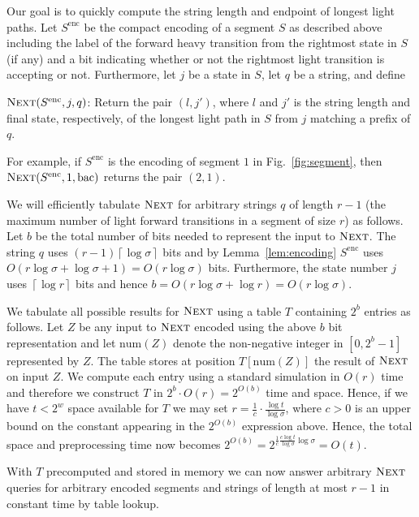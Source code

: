 \documentclass{article}
\newcommand{\num}{\ensuremath{\mathrm{num}}}
\newcommand{\enc}{\ensuremath{\mathrm{enc}}}
\newcommand{\Next}{\ensuremath{\textsc{Next}}}
\newcommand{\ceil}[1]{\left\lceil{#1}\right\rceil}
\begin{document}
Our goal is to quickly compute the string length and endpoint of
longest light paths. Let $S^{\enc}$ be the compact encoding of a
segment $S$ as described above including the label of the forward
heavy transition from the rightmost state in $S$ (if any) and a bit
indicating whether or not the rightmost light transition is accepting
or not. Furthermore, let $j$ be a state in $S$, let $q$ be a string,
and define
\begin{relate}
\item[$\Next(S^{\enc}, j, q)$:] Return the pair $(l, j')$, where $l$
  and $j'$ is the string length and final state, respectively, of the longest
  light path in $S$ from $j$ matching a prefix of $q$.
\end{relate}
For example, if $S^{\enc}$ is the encoding of segment $1$
in Fig.~\ref{fig:segment}, then $\Next(S^{\enc}, 1, \text{bac})$
returns the pair $(2, 1)$. 


We will efficiently tabulate $\Next$ for arbitrary strings $q$ of
length $r-1$ (the maximum number of light forward transitions in a
segment of size $r$) as follows. Let $b$ be the total number of bits
needed to represent the input to $\Next$. The string $q$ uses $(r-1)
\ceil{\log \sigma}$ bits and by Lemma~\ref{lem:encoding} $S^\enc$ uses
$O(r \log \sigma + \log \sigma + 1) = O(r \log \sigma)$
bits. Furthermore, the state number $j$ uses $\ceil{\log r}$ bits and
hence $b = O(r\log \sigma + \log r) = O(r \log \sigma)$. 

We tabulate all possible results for $\Next$ using a table $T$
containing $2^b$ entries as follows. Let $Z$ be any input to $\Next$
encoded using the above $b$ bit representation and let $\num(Z)$
denote the non-negative integer in $[0, 2^b-1]$ represented by
$Z$. The table stores at position $T[\num(Z)]$ the result of
$\Next$ on input $Z$. We compute each entry using a standard
simulation in $O(r)$ time and therefore we construct $T$ in $2^b \cdot
O(r) = 2^{O(b)}$ time and space. Hence, if we have $t < 2^w$ space
available for $T$ we may set $r = \frac{1}{c} \cdot \frac{ \log
  t}{\log \sigma}$, where $c > 0$ is an upper bound on the constant
appearing in the $2^{O(b)}$ expression above. Hence, the total space
and preprocessing time now becomes $2^{O(b)} =
2^{\frac{1}{c}\frac{c\log t}{\log \sigma} \log \sigma} = O(t)$.


With $T$ precomputed and stored in memory we can now answer arbitrary
$\Next$ queries for arbitrary encoded segments and strings of length
at most $r-1$ in constant time by table lookup.  
\end{document}
